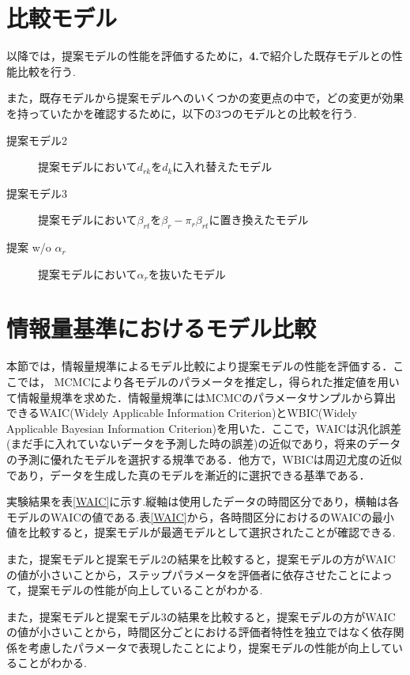 \documentclass[a4paper,11pt,oneside,openany]{jsbook}
\begin{document}
\newpage
\section{比較モデル}
以降では，提案モデルの性能を評価するために，\textbf{4.}で紹介した既存モデルとの性能比較を行う.

また，既存モデルから提案モデルへのいくつかの変更点の中で，どの変更が効果を持っていたかを確認するために，以下の3つのモデルとの比較を行う.

\begin{description}
\item [提案モデル2]提案モデルにおいて$d_{rk}$を$d_k$に入れ替えたモデル
\item[提案モデル3]提案モデルにおいて$\beta_{rt}$を$\beta_{r} - \pi_{r}\beta_{rt}$に置き換えたモデル
\item[提案 w/o $\alpha_r$]提案モデルにおいて$\alpha_r$を抜いたモデル
\end{description}

\section{情報量基準におけるモデル比較}

本節では，情報量規準によるモデル比較により提案モデルの性能を評価する．ここでは， MCMCにより各モデルのパラメータを推定し，得られた推定値を用いて情報量規準を求めた．情報量規準にはMCMCのパラメータサンプルから算出できるWAIC(Widely Applicable Information Criterion)とWBIC(Widely Applicable Bayesian Information Criterion)を用いた．ここで，WAICは汎化誤差(まだ手に入れていないデータを予測した時の誤差)の近似であり，将来のデータの予測に優れたモデルを選択する規準である．他方で，WBICは周辺尤度の近似であり，データを生成した真のモデルを漸近的に選択できる基準である．

実験結果を表\ref{WAIC}に示す.縦軸は使用したデータの時間区分であり，横軸は各モデルのWAICの値である.表\ref{WAIC}から，各時間区分におけるのWAICの最小値を比較すると，提案モデルが最適モデルとして選択されたことが確認できる.

また，提案モデルと提案モデル2の結果を比較すると，提案モデルの方がWAICの値が小さいことから，ステップパラメータを評価者に依存させたことによって，提案モデルの性能が向上していることがわかる.

また，提案モデルと提案モデル3の結果を比較すると，提案モデルの方がWAICの値が小さいことから，時間区分ごとにおける評価者特性を独立ではなく依存関係を考慮したパラメータで表現したことにより，提案モデルの性能が向上していることがわかる.
\end{document}
